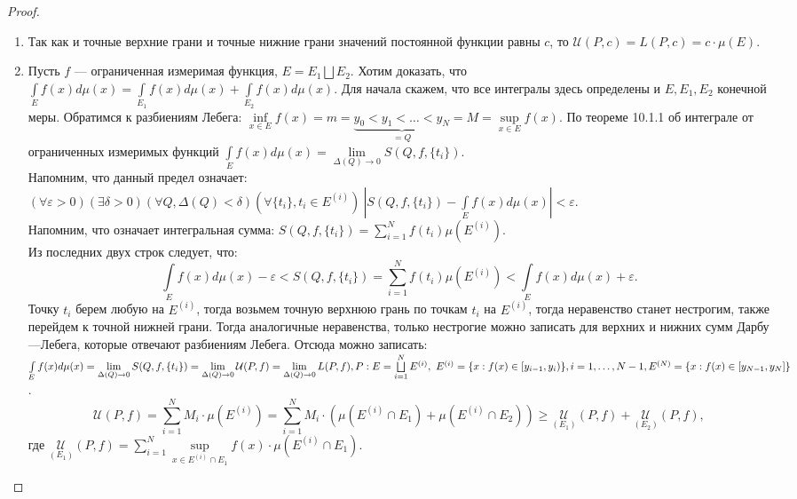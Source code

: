 \begin{proof}\ 
\begin{enumerate}
	\item Так как и точные верхние грани и точные нижние грани значений постоянной функции равны $c$, то $\mathcal{U}(P, c)=L(P, c)=c\cdot \mu(E)$.
	\item Пусть $f$ --- ограниченная измеримая функция, $E=E_1\bigsqcup E_2$. Хотим доказать, что $\int\limits_E f(x)d\mu(x)=\int\limits_{E_1} f(x)d\mu(x)+\int\limits_{E_2} f(x)d\mu(x)$. Для начала скажем, что все интегралы здесь определены и $E, E_1, E_2$  конечной меры. Обратимся к разбиениям Лебега:
	$\inf\limits_{x\in E}f(x)=m=\underbrace{y_0<y_1<\ldots<y_N}_{=Q}=M=\sup\limits_{x\in E} f(x)$. По теореме 10.1.1 об интеграле от ограниченных измеримых функций $\int\limits_{E}f(x)d\mu(x)=\lim\limits_{\Delta(Q)\to0}S(Q, f,\{t_i\})$.\\
	Напомним, что данный предел означает:\\ $(\forall \varepsilon >0)(\exists\delta>0)(\forall Q,  \Delta(Q)<\delta)(\forall \{t_i\}, t_i\in E^{(i)})\ |S(Q, f, \{t_i\})-\int\limits_E f(x)d\mu(x)|<\varepsilon$.\\
	Напомним, что означает интегральная сумма: $S(Q, f, \{t_i\})=\sum\limits_{i=1}^Nf(t_i)\mu(E^{(i)})$.\\
	Из последних двух строк следует, что:\\
	$$\int\limits_E f(x)d\mu(x)-\varepsilon<S(Q, f, \{t_i\})=\sum\limits_{i=1}^Nf(t_i)\mu(E^{(i)})<\int\limits_E f(x)d\mu(x)+\varepsilon.$$
	Точку $t_i$ берем любую на $E^{(i)}$, тогда возьмем точную верхнюю грань по точкам $t_i$ на $E^{(i)}$, тогда неравенство станет нестрогим, также перейдем к точной нижней грани. Тогда аналогичные неравенства, только нестрогие можно записать для верхних и нижних сумм Дарбу---Лебега, которые отвечают разбиениям Лебега. Отсюда можно записать: $\int\limits_{E}f(x)d\mu(x)=\lim\limits_{\Delta(Q)\to0}S(Q, f,\{t_i\}) = \lim\limits_{\Delta(Q)\to 0}\mathcal{U}(P, f)=\lim\limits_{\Delta(Q)\to 0}L(P, f),\\  
	P:E=\bigsqcup\limits_{i=1}^N E^{(i)},\ E^{(i)} = \{x:f(x)\in [y_{i-1}, y_i)\}, i=1, \ldots, N-1, E^{(N)} = \{x:f(x)\in [y_{N-1}, y_N]\}$.\\
	$$\mathcal{U}(P, f)=\sum\limits_{i=1}^N M_i\cdot\mu(E^{(i)})=\sum\limits_{i=1}^N M_i\cdot\left(\mu(E^{(i)}\cap E_1)+\mu(E^{(i)}\cap E_2) \right) \geqslant \underset{(E_1)}{\mathcal{U}}(P,f)+\underset{(E_2)}{\mathcal{U}}(P,f),$$ где $\underset{(E_1)}{\mathcal{U}}(P,f) = \sum\limits_{i=1}^N \sup\limits_{x\in E^{(i)}\cap E_1}f(x)\cdot\mu(E^{(i)}\cap E_1)$.\\ 

\end{enumerate}
\end{proof}

